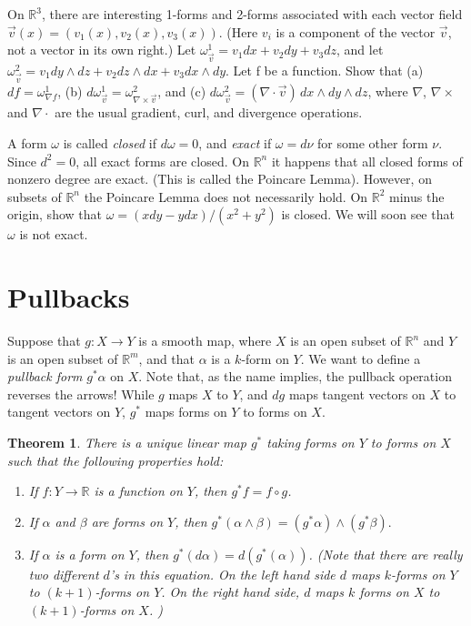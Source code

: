 \documentclass[12pt]{amsbook}
\newcommand{\R}{{\mathbb R}}
\newtheorem{thm}{Theorem}[section]
\theoremstyle{definition}
\begin{document}
\smallskip

 On $\R^3$, there are interesting 1-forms 
and 2-forms associated with each vector field 
$\vec v(x) = (v_1(x), v_2(x), v_3(x))$. 
(Here $v_i$ is a component of the vector $\vec v$, not a vector in its
own right.) Let $\omega^1_{\vec v} = v_1dx + v_2dy + v_3dz$, and let 
$\omega^2_{\vec v}=
v_1dy \wedge dz + v_2dz \wedge dx + v_3dx \wedge dy$.
Let f be a function. Show that (a) $df = \omega^1_{\nabla f}$, 
(b) $d\omega^1_{\vec v}  = \omega^2_{\nabla \times \vec v}$, and (c) $d \omega^2_{\vec v} =
(\nabla \cdot \vec v)\, dx\wedge dy \wedge dz$, 
where $\nabla$, $\nabla \times$ and $\nabla \cdot$ 
are the usual gradient, curl, and divergence
operations.

\smallskip

 A form $\omega$ is called {\em closed} 
if $d\omega = 0$, 
and {\em exact} if $\omega = d \nu$ for some other form $\nu$.
Since $d^2 = 0$, all exact forms are closed. On $\R^n$ it happens that
all closed forms of nonzero degree are exact. 
(This is called the Poincare Lemma). However, on
subsets of $\R^n$ the Poincare Lemma does not necessarily hold.  
On $\R^2$ minus the origin, 
show that $\omega = (xdy - ydx)/(x^2+y^2)$
is closed. We will soon see that $\omega$ is not exact.

\section{Pullbacks}

Suppose that $g: X \to Y$ is a smooth map, where $X$ is an open subset
of $\R^n$ and $Y$ is an open subset of $\R^m$, and that $\alpha$ is a
$k$-form on $Y$. We want to define a {\em pullback form} $g^* \alpha$
on $X$.  Note that, as the name implies, the pullback operation
reverses the arrows!  While $g$ maps $X$ to $Y$, and $dg$ maps tangent
vectors on $X$ to tangent vectors on $Y$, $g^*$ maps forms on $Y$ to
forms on $X$.

\begin{thm}
  There is a unique linear map $g^*$ taking forms on $Y$ to forms on
  $X$ such that the following properties hold:
\begin{enumerate}
\item If $f: Y \to \R$ is a function on $Y$, then $g^*f = f \circ g$. 
\item If $\alpha$ and $\beta$ are forms on $Y$, then 
$g^*(\alpha \wedge \beta)=(g^* \alpha) \wedge (g^* \beta).$
\item If $\alpha$ is a form on $Y$, then $g^*(d\alpha) = d(g^*(\alpha))$. (Note that there are really two
different $d$'s in this equation. On the left hand side $d$ maps $k$-forms on $Y$ to $(k+1)$-forms on $Y$. 
On the right hand side, $d$ maps $k$ forms on $X$ to $(k+1)$-forms on $X$. )
\end{enumerate}
\end{thm}
\end{document}
